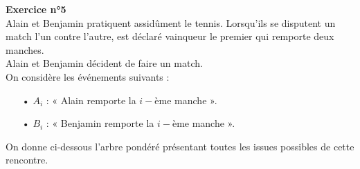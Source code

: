 \textbf{Exercice n°5} \\

Alain et Benjamin pratiquent assidûment le tennis. Lorsqu'ils se disputent un match l'un contre l'autre, est déclaré vainqueur le premier qui remporte deux manches. \\

Alain et Benjamin décident de faire un match. \\

On considère les événements suivants : \\

\begin{itemize}
\item[•] $A_i$ : « Alain remporte la $i-$ème manche ».\item[•] $B_i$ : « Benjamin remporte la $i-$ème manche ».
\end{itemize}

\vspace*{.3cm}

On donne ci-dessous l'arbre pondéré présentant toutes les issues possibles de cette rencontre. \\

